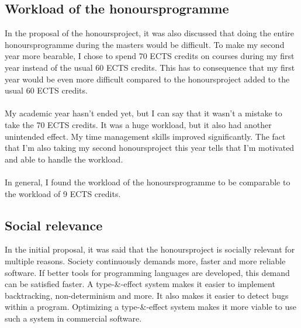 \subsection{Workload of the honoursprogramme}
In the proposal of the honoursproject, it was also discussed that doing the entire honoursprogramme during the masters would be difficult. To make my second year more bearable, I chose to spend 70 ECTS credits on courses during my first year instead of the usual 60 ECTS credits. This has to consequence that my first year would be even more difficult compared to the honoursproject added to the usual 60 ECTS credits. \\
\\
My academic year hasn't ended yet, but I can say that it wasn't a mistake to take the 70 ECTS credits. It was a huge workload, but it also had another unintended effect. My time management skills improved significantly. The fact that I'm also taking my second honoursproject this year tells that I'm motivated and able to handle the workload. \\
\\
In general, I found the workload of the honoursprogramme to be comparable to the workload of 9 ECTS credits. 

\subsection{Social relevance}
In the initial proposal, it was said that the honoursproject is socially relevant for multiple reasons. Society continuously demands more, faster and more reliable software. If better tools for programming languages are developed, this demand can be satisfied faster. A type-\&-effect system makes it easier to implement backtracking, non-determinism and more. It also makes it easier to detect bugs within a program. Optimizing a type-\&-effect system makes it more viable to use such a system in commercial software. 
